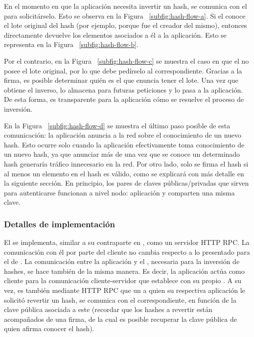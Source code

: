 %
En el momento en que la aplicación necesita invertir un hash, se comunica con el \hcollector
para solicitárselo. Esto se observa en la Figura ~\ref{subfig:hash-flow-a}.
%
Si el \hcollector conoce el lote original del hash (por ejemplo, porque fue el \hcollector creador
del mismo), entonces directamente devuelve los elementos asociados a él a la aplicación.
Esto se representa en la Figura ~\ref{subfig:hash-flow-b}.
%

Por el contrario, en la Figura ~\ref{subfig:hash-flow-c} se muestra el caso en que el \hcollector no posee el lote original,
por lo que debe pedírselo al \hcollector correspondiente. Gracias a la firma, es posible determinar
quién es el \hcollector que enuncia tener el lote. Una vez que obtiene el inverso, lo almacena para
futuras peticiones y lo pasa a la aplicación. De esta forma, es transparente para la aplicación
cómo se resuelve el proceso de inversión.

%

En la Figura ~\ref{subfig:hash-flow-d} se muestra el último paso posible de esta comunicación: la aplicación
anuncia a la red sobre el conocimiento de un nuevo hash. Esto ocurre solo cuando la aplicación
efectivamente toma conocimiento de un nuevo hash, ya que anunciar más de una vez que se conoce un
determinado hash generaría tráfico innecesario en la red. Por otro lado, solo se firma el hash si al
menos un elemento en el hash es válido, como se explicará con más detalle en la siguiente sección.
%
En principio, los pares de claves públicas/privadas que sirven para autenticarse
funcionan a nivel nodo: aplicación y \hcollector comparten una misma clave.

\subsubsection{Detalles de implementación}
El \hcollector se implementa, similar a su contraparte en \compresschain, como un servidor HTTP RPC.
%
La comunicación con él por parte del cliente no cambia respecto a lo presentado para el \collector
de \compresschain.
%
La comunicación entre la aplicación y el \hcollector, necesaria para la inversión de hashes,
se hace también de la misma manera.
Es decir, la aplicación actúa como cliente para la comunicación cliente-servidor que establece con
su propio \hcollector.
%
A su vez, es también mediante HTTP RPC que un \hcollector a quien su respectiva aplicación
le solicitó revertir un hash, se comunica con el \hcollector correspondiente, en función de la clave
pública asociada a este (recordar que los hashes a revertir están acompañados de una firma, de la cual
es posible recuperar la clave pública de quien afirma conocer el hash).

